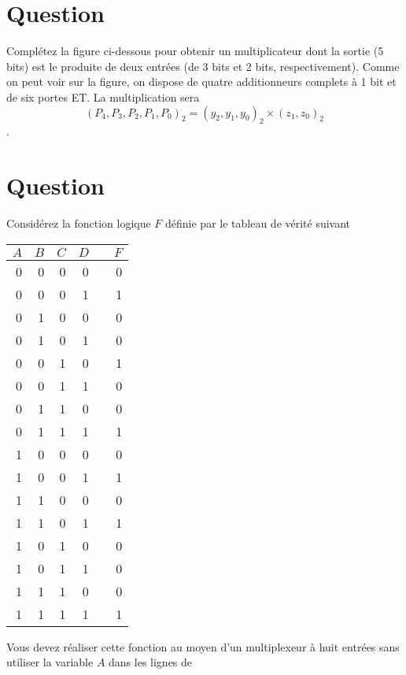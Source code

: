 \documentclass[letter, oneside]{book}
\begin{document}
\section*{Question}
\label{sec:org2fd5137}
Complétez la figure ci-dessous pour obtenir un multiplicateur dont
  la sortie (5 bits) est le produite de deux entrées (de 3 bits et 2
  bits, respectivement). Comme on peut voir sur la figure, on dispose
  de quatre additionneurs complets à 1 bit et de six portes ET. La
  multiplication sera $$(P_4, P_3, P_2, P_1, P_0)_2 = (y_2, y_1, y_0)_2
    \times (z_1, z_0)_2$$.
  \begin{center}

\end{center}

\section*{Question}
\label{sec:orgc754d10}
Considérez la fonction logique \(F\) définie par le tableau de vérité suivant
\begin{center}
\begin{tabular}{rrrrlr}
\(A\) & \(B\) & \(C\) & \(D\) &  & \(F\)\\[0pt]
\hline
0 & 0 & 0 & 0 &  & 0\\[0pt]
0 & 0 & 0 & 1 &  & 1\\[0pt]
0 & 1 & 0 & 0 &  & 0\\[0pt]
0 & 1 & 0 & 1 &  & 0\\[0pt]
0 & 0 & 1 & 0 &  & 1\\[0pt]
0 & 0 & 1 & 1 &  & 0\\[0pt]
0 & 1 & 1 & 0 &  & 0\\[0pt]
0 & 1 & 1 & 1 &  & 1\\[0pt]
1 & 0 & 0 & 0 &  & 0\\[0pt]
1 & 0 & 0 & 1 &  & 1\\[0pt]
1 & 1 & 0 & 0 &  & 0\\[0pt]
1 & 1 & 0 & 1 &  & 1\\[0pt]
1 & 0 & 1 & 0 &  & 0\\[0pt]
1 & 0 & 1 & 1 &  & 0\\[0pt]
1 & 1 & 1 & 0 &  & 0\\[0pt]
1 & 1 & 1 & 1 &  & 1\\[0pt]
\end{tabular}
\end{center}
Vous devez réaliser cette fonction au moyen d'un multiplexeur à huit
entrées sans utiliser la variable \(A\) dans les lignes de
\end{document}
